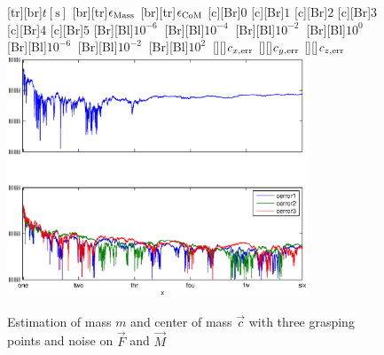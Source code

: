 \begin{figure}
	\centering	
	[tr][br]{$t\left[\mathrm{s}\right]$}
	[br][tr]{$\epsilon_{\mathrm{Mass}}$}
	[br][tr]{$\epsilon_{\mathrm{CoM}}$}
	[Br]{$0$}
	[Br]{$1$}
	[Br]{$2$}
	[Br]{$3$}
	[Br]{$4$}
	[Br]{$5$}
	[Br][Bl]{$10^{-6}\  $}
	[Br][Bl]{$10^{-4}\  $}
	[Br][Bl]{$10^{-2}\  $}
	[Br][Bl]{$10^0\  $}
	[Br][Bl]{$10^{-6}\  $}
	[Br][Bl]{$10^{-2}\  $}
	[Br][Bl]{$10^{2}\  $}
	[][]{\tiny $c_{x,\mathrm{err}}$}
	[][]{\tiny $c_{y,\mathrm{err}}$}
	[][]{\tiny $c_{z,\mathrm{err}}$}
	\includegraphics[width=0.8\textwidth]{figures/mass_multi_noise.eps}
	\vspace{0.2cm}
	\caption[Mass error, three grasping points and noise]{Estimation of mass $m$ and center of mass $\vec{c}$ with three grasping points and noise on $\vec F$ and $\vec M$}
	\label{fig:estim_mass_multi_noise}
\end{figure}


